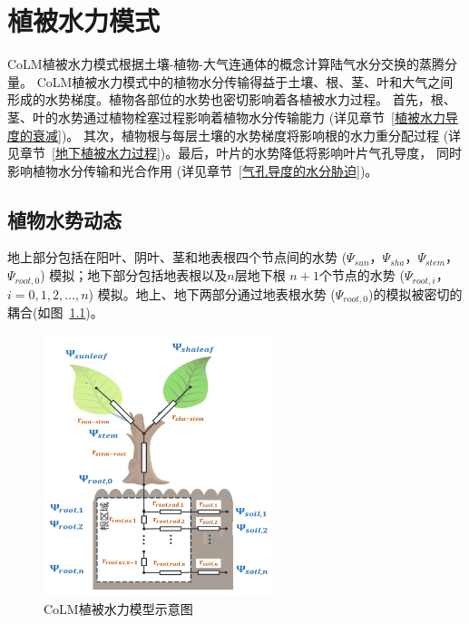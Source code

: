 \chapter{植被水力模式}

CoLM植被水力模式根据土壤-植物-大气连通体的概念计算陆气水分交换的蒸腾分量。
CoLM植被水力模式中的植物水分传输得益于土壤、根、茎、叶和大气之间形成的水势梯度。植物各部位的水势也密切影响着各植被水力过程。
首先，根、茎、叶的水势通过植物栓塞过程影响着植物水分传输能力 (详见章节~\ref{植被水力导度的衰减})。
其次，植物根与每层土壤的水势梯度将影响根的水力重分配过程 (详见章节~\ref{地下植被水力过程})。最后，叶片的水势降低将影响叶片气孔导度，
同时影响植物水分传输和光合作用 (详见章节~\ref{气孔导度的水分胁迫})。


\section{植物水势动态}\label{植物水势动态}
地上部分包括在阳叶、阴叶、茎和地表根四个节点间的水势 ($\Psi_{sun}$，$\Psi_{sha}$，$\Psi_{stem}$，$\Psi_{root,0}$)
%
 模拟；地下部分包括地表根以及$n$层地下根 $n+1$个节点的水势 ($\Psi_{root,i}$，$i=0,1,2,\ldots,n$) 模拟。地上、地下两部分通过地表根水势
 ($\Psi_{root,0}$)的模拟被密切的耦合(如图~\ref{fig:CoLM植被水力模型示意图})。

{
\begin{figure}[htb]
\centering
\includegraphics[width=0.6\textwidth]{Figures/植被水力模式/CoLM植被水力模型示意图.png}
\caption{CoLM植被水力模型示意图}
\label{fig:CoLM植被水力模型示意图}
\end{figure}
}


